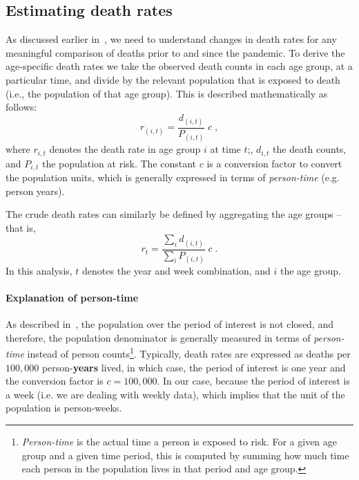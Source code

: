 \documentclass[
10pt, %
a4paper, %
oneside, %
DIV=16,
parskip=full,
headinclude,footinclude %
]{scrartcl}
\begin{document}
\subsection{Estimating death rates}\label{subsec:death_rates}

As discussed earlier in~, we need to understand changes in death rates for any meaningful comparison of deaths prior to and since the pandemic. To derive the age-specific death rates we take the observed death counts in each age group, at a particular time, and divide by the relevant population that is exposed to death (i.e., the population of that age group). This is described mathematically as follows:
% 
\begin{equation}
r_{(i,t)} = \frac{d_{(i,t)}}{P_{(i,t)}} \; c \;,
\label{eq:death_rate}
\end{equation}
% 
where $r_{i,t}$ denotes the death rate in age group $i$ at time $t$;, $d_{i,t}$ the death counts, and $P_{i,t}$ the population at risk. The constant $c$ is a conversion factor to convert the population units, which is generally expressed in terms of \textit{person-time} (e.g. person years). 

The crude death rates can similarly be defined by aggregating the age groups -- that is,
\begin{equation}
r_{t} = \frac{\sum\limits_{i} d_{(i,t)}}{\sum\limits_{i} P_{(i,t)}} \; c \;.
\label{eq:crude_death_rate}
\end{equation}
%
In this analysis, $t$ denotes the year and week combination, and $i$ the age group. 

\paragraph{Explanation of person-time} As described in~, the population over the period of interest is not closed, and therefore, the population denominator is generally measured in terms of \textit{person-time} instead of person counts\footnote{\textit{Person-time} is the actual time a person is exposed to risk. For a given age group and a given time period, this is computed by summing how much time each person in the population lives in that period and age group.}. Typically, death rates are expressed as deaths per $100,000$ person-\textbf{years} lived, in which case, the period of interest is one year and the conversion factor is $c = 100,000$. In our case, because the period of interest is a week (i.e. we are dealing with weekly data), which implies that the unit of the population is person-weeks.
\end{document}
